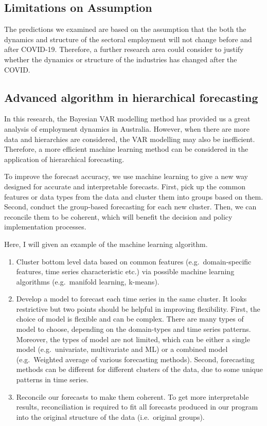 \documentclass{monashthesis}
\begin{document}
\hypertarget{limitations-on-assumption}{%
\subsection{Limitations on Assumption}\label{limitations-on-assumption}}

The predictions we examined are based on the assumption that the both the dynamics and structure of the sectoral employment will not change before and after COVID-19. Therefore, a further research area could consider to justify whether the dynamics or structure of the industries has changed after the COVID.

\hypertarget{advanced-algorithm-in-hierarchical-forecasting}{%
\subsection{Advanced algorithm in hierarchical forecasting}\label{advanced-algorithm-in-hierarchical-forecasting}}

In this research, the Bayesian VAR modelling method has provided us a great analysis of employment dynamics in Australia. However, when there are more data and hierarchies are considered, the VAR modelling may also be inefficient. Therefore, a more efficient machine learning method can be considered in the application of hierarchical forecasting.

To improve the forecast accuracy, we use machine learning to give a new way designed for accurate and interpretable forecasts. First, pick up the common features or data types from the data and cluster them into groups based on them. Second, conduct the group-based forecasting for each new cluster. Then, we can reconcile them to be coherent, which will benefit the decision and policy implementation processes.

Here, I will given an example of the machine learning algorithm.

\begin{enumerate}
\def\labelenumi{\arabic{enumi}.}
\item
  Cluster bottom level data based on common features (e.g.~domain-specific features, time series characteristic etc.) via possible machine learning algorithms (e.g.~manifold learning, k-means).
\item
  Develop a model to forecast each time series in the same cluster. It looks restrictive but two points should be helpful in improving flexibility. First, the choice of model is flexible and can be complex. There are many types of model to choose, depending on the domain-types and time series patterns. Moreover, the types of model are not limited, which can be either a single model (e.g.~univariate, multivariate and ML) or a combined model (e.g.~Weighted average of various forecasting methods). Second, forecasting methods can be different for different clusters of the data, due to some unique patterns in time series.
\item
  Reconcile our forecasts to make them coherent. To get more interpretable results, reconciliation is required to fit all forecasts produced in our program into the original structure of the data (i.e.~original groups).
\end{enumerate}
\end{document}
